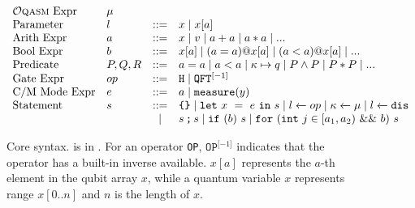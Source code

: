 \begin{figure}[t]
{
  \small
  \[\begin{array}{llcl} 
      \text{\oqasm Expr} & \mu\\
      \text{Parameter} & l & ::= & x \mid x[a] \\
      \text{Arith Expr} & a & ::= & x \mid v \mid a + a \mid a * a \mid ... \\
      \text{Bool Expr} & b & ::= & x[a] \mid (a = a) @ x[a] \mid (a < a) @ x[a] \mid ... \\
      \text{Predicate} & P,Q,R & ::= & a = a \mid a < a \mid \kappa \mapsto q \mid P \wedge P \mid P * P \mid ... \\
      \text{Gate Expr} & op & ::= & \texttt{H} \mid \iqft[\lbrack -1 \rbrack]{}{} \\
      \text{C/M Mode Expr}& e & ::= & a \mid \smea{y} \\
      \text{Statement} & s & ::= & \sskip \mid \sexp{x}{e}{s} \mid  \ssassign{l}{}{op} \mid \ssassign{\kappa}{}{\mu} 
                                 \mid \ssassign{l}{}{\sdis}
                                 \\ & & \mid & \sseq{s}{s} \mid \sifq{b}{s} \mid
                                     \sqwhile{j}{a_1}{a_2}{b}{s}
    \end{array}
  \]
}
\vspace*{-1em}
  \caption{Core \qafny syntax. \oqasm is in . For an operator \texttt{OP}, $\texttt{OP}^{\lbrack -1 \rbrack}$ indicates that the operator has a built-in inverse available. $x[a]$ represents the $a$-th element in the qubit array $x$, while a quantum variable $x$ represents range $x[0..n]$ and $n$ is the length of $x$. }
  \label{fig:vqimp}

\vspace*{-0.5em}
{
{\Small
  \begin{mathpar}




\end{mathpar}}}
\end{figure}
